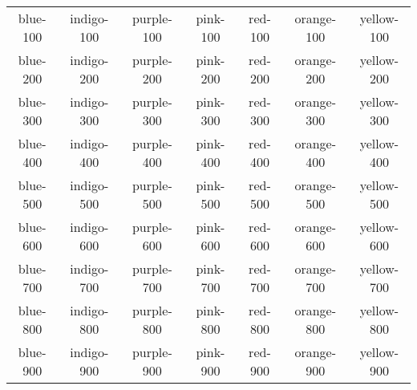 \documentclass{article}
\begin{document}
\Large
\begin{tabular}{ |c|c|c|c|c|c|c| } 
    \hline
    \cellcolor{blue-100} blue-100 & \cellcolor{indigo-100} indigo-100 & \cellcolor{purple-100} purple-100 & \cellcolor{pink-100} pink-100 & \cellcolor{red-100} red-100 &  \cellcolor{orange-100} orange-100 & \cellcolor{yellow-100} yellow-100 \\ 
    \cellcolor{blue-200} blue-200 & \cellcolor{indigo-200} indigo-200 & \cellcolor{purple-200} purple-200 & \cellcolor{pink-200} pink-200 & \cellcolor{red-200} red-200 &  \cellcolor{orange-200} orange-200 & \cellcolor{yellow-200} yellow-200 \\ 
    \cellcolor{blue-300} blue-300 & \cellcolor{indigo-300} indigo-300 & \cellcolor{purple-300} purple-300 & \cellcolor{pink-300} pink-300 & \cellcolor{red-300} red-300 &  \cellcolor{orange-300} orange-300 & \cellcolor{yellow-300} yellow-300 \\ 
    \cellcolor{blue-400} blue-400 & \cellcolor{indigo-400} indigo-400 & \cellcolor{purple-400} purple-400 & \cellcolor{pink-400} pink-400 & \cellcolor{red-400} red-400 &  \cellcolor{orange-400} orange-400 & \cellcolor{yellow-400} yellow-400 \\ 
    \cellcolor{blue-500} blue-500 & \cellcolor{indigo-500} indigo-500 & \cellcolor{purple-500} purple-500 & \cellcolor{pink-500} pink-500 & \cellcolor{red-500} red-500 &  \cellcolor{orange-500} orange-500 & \cellcolor{yellow-500} yellow-500 \\ 
    \cellcolor{blue-600} blue-600 & \cellcolor{indigo-600} indigo-600 & \cellcolor{purple-600} purple-600 & \cellcolor{pink-600} pink-600 & \cellcolor{red-600} red-600 &  \cellcolor{orange-600} orange-600 & \cellcolor{yellow-600} yellow-600 \\ 
    \cellcolor{blue-700}\color{white} blue-700 & \cellcolor{indigo-700}\color{white} indigo-700 & \cellcolor{purple-700}\color{white} purple-700 & \cellcolor{pink-700}\color{white} pink-700 & \cellcolor{red-700}\color{white} red-700 &  \cellcolor{orange-700}\color{white} orange-700 & \cellcolor{yellow-700}\color{white} yellow-700 \\ 
    \cellcolor{blue-800}\color{white} blue-800 & \cellcolor{indigo-800}\color{white} indigo-800 & \cellcolor{purple-800}\color{white} purple-800 & \cellcolor{pink-800}\color{white} pink-800 & \cellcolor{red-800}\color{white} red-800 &  \cellcolor{orange-800}\color{white} orange-800 & \cellcolor{yellow-800}\color{white} yellow-800 \\ 
    \cellcolor{blue-900}\color{white} blue-900 & \cellcolor{indigo-900}\color{white} indigo-900 & \cellcolor{purple-900}\color{white} purple-900 & \cellcolor{pink-900}\color{white} pink-900 & \cellcolor{red-900}\color{white} red-900 &  \cellcolor{orange-900}\color{white} orange-900 & \cellcolor{yellow-900}\color{white} yellow-900 \\ 
    \hline
\end{tabular}\vspace{5mm}
\end{document}

